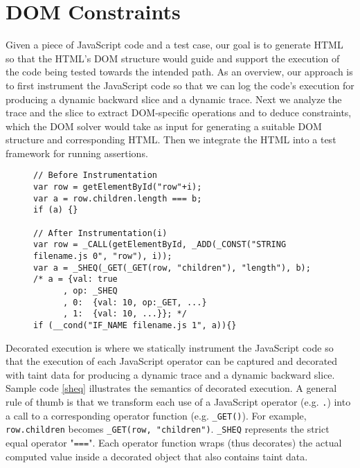 \section{DOM Constraints}
Given a piece of JavaScript code and a test case, our goal is to generate HTML so that the HTML's DOM structure would guide and support the execution of the code being tested towards the intended path.  
As an overview, our approach is to first instrument the JavaScript code so that we can log the code's execution for producing a dynamic backward slice and a dynamic trace.  
Next we analyze the trace and the slice to extract DOM-specific operations and to deduce constraints, which the DOM solver would take as input for generating a suitable DOM structure and corresponding HTML.  
Then we integrate the HTML into a test framework for running assertions.  

\begin{figure}
\begin{lstlisting}[caption=Example showing how code is instrumented for dynamic analysis.  The comment at line 9 shows the decorated object {\tt a} and its nested tree data structure.  {\tt a}'s actual value is {\tt true} because both left and right hand side have the same value 10.,label=sheq]  
// Before Instrumentation
var row = getElementById("row"+i);
var a = row.children.length === b; 
if (a) {}

// After Instrumentation(i)
var row = _CALL(getElementById, _ADD(_CONST("STRING filename.js 0", "row"), i));
var a = _SHEQ(_GET(_GET(row, "children"), "length"), b);
/* a = {val: true
      , op:	_SHEQ
      , 0:	{val: 10, op:_GET, ...}
      , 1:	{val: 10, ...}}; */
if (__cond("IF_NAME filename.js 1", a)){}
\end{lstlisting}
\end{figure}

Decorated execution is where we statically instrument the JavaScript code so that the execution of each JavaScript operator can be captured and decorated with taint data for producing a dynamic trace and a dynamic backward slice.  Sample code \ref{sheq} illustrates the semantics of decorated execution.  
A general rule of thumb is that we transform each use of a JavaScript operator (e.g. {\tt .}) into a call to a corresponding operator function (e.g. {\tt \_GET()}).  For example, {\tt row.children} becomes {\tt \_GET(row, "children")}.  {\tt \_SHEQ} represents the strict equal operator "{\tt ===}".  
Each operator function wraps (thus decorates) the actual computed value inside a decorated object that also contains taint data.   


